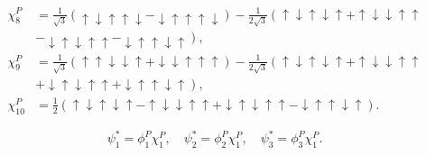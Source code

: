 \documentclass[prd,twocolumn,floatfix,nofootinbib]{revtex4}
\begin{document}
\begin{equation}
\begin{aligned}
        \chi_{8}^{P} &= \frac{1}{\sqrt{3}}\left(\uparrow\downarrow\uparrow\uparrow\downarrow - \downarrow\uparrow\uparrow\uparrow\downarrow\right)
            -\frac{1}{2\sqrt{3}}\left(\uparrow\downarrow\uparrow\downarrow\uparrow + \uparrow\downarrow\downarrow\uparrow\uparrow \right. \\
            &\left. -\downarrow\uparrow\downarrow\uparrow\uparrow - \downarrow\uparrow\uparrow\downarrow\uparrow\right), \\ 
        \chi_{9}^{P} &= \frac{1}{\sqrt{3}}\left(\uparrow\uparrow\downarrow\downarrow\uparrow + \downarrow\downarrow\uparrow\uparrow\uparrow\right)
            -\frac{1}{2\sqrt{3}}\left(\uparrow\downarrow\uparrow\downarrow\uparrow + \uparrow\downarrow\downarrow\uparrow\uparrow \right. \\
            &\left. +\downarrow\uparrow\downarrow\uparrow\uparrow + \downarrow\uparrow\uparrow\downarrow\uparrow\right), \\ 
        \chi_{10}^{P} &= \frac{1}{2}\left(\uparrow\downarrow\uparrow\downarrow\uparrow - \uparrow\downarrow\downarrow\uparrow\uparrow
            +\downarrow\uparrow\downarrow\uparrow\uparrow -\downarrow\uparrow\uparrow\downarrow\uparrow\right).
    \end{aligned}
\end{equation}

\begin{equation}
    \psi_{1}^{*} = \phi_{1}^{P}\chi_{1}^{P}, \quad
    \psi_{2}^{*} = \phi_{2}^{P}\chi_{1}^{P}, \quad
    \psi_{3}^{*} = \phi_{3}^{P}\chi_{1}^{P}.
\end{equation}
\end{document}
